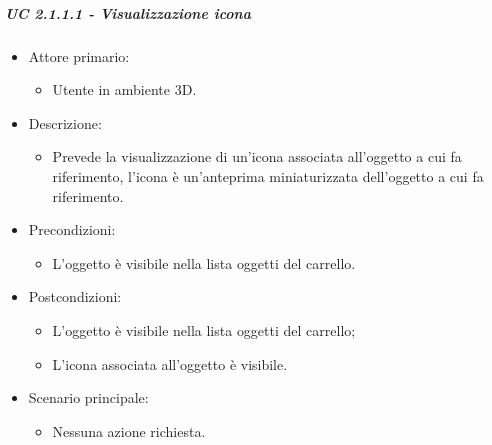 \subparagraph{UC 2.1.1.1 - Visualizzazione icona}
\begin{itemize}
	
	\item Attore primario: 
	\begin{itemize}
		\item Utente in ambiente 3D.
	\end{itemize}
	\item Descrizione:
	\begin{itemize}
		\item Prevede la visualizzazione di un'icona associata all'oggetto a cui fa riferimento, l'icona è un'anteprima miniaturizzata dell'oggetto a cui fa riferimento.
	\end{itemize}
	
	\item Precondizioni:
	\begin{itemize}
		\item L'oggetto è visibile nella lista oggetti del carrello.
	\end{itemize}
	
	\item Postcondizioni:
	\begin{itemize}
		\item L'oggetto è visibile nella lista oggetti del carrello;
		\item L'icona associata all'oggetto è visibile.
	\end{itemize}
	
	\item Scenario principale:
	\begin{itemize}
		\item Nessuna azione richiesta.
	\end{itemize}
	
\end{itemize}

